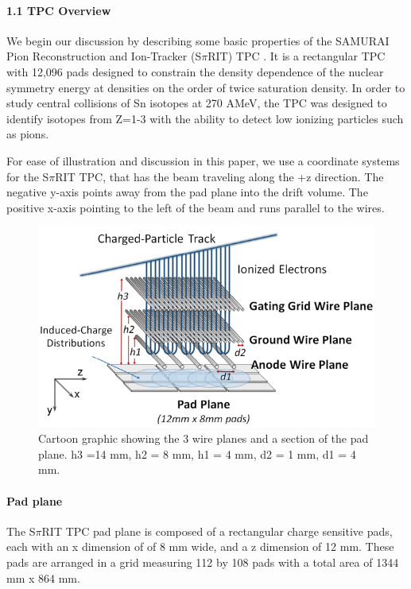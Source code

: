 \documentclass[review]{elsarticle}
\begin{document}
\paragraph{1.1 TPC Overview}
We begin our discussion by describing some basic properties of the SAMURAI Pion Reconstruction and Ion-Tracker (S$\pi$RIT) TPC \citep{shane}. It is a rectangular TPC with 12,096 pads designed to constrain the density dependence of the nuclear symmetry energy at densities on the order of twice saturation density. In order to study central collisions of Sn isotopes at 270 AMeV, the TPC was designed to identify isotopes from Z=1-3 with the ability to detect low ionizing particles such as pions. 

For ease of illustration and discussion in this paper, we use a coordinate systems for the S$\pi$RIT TPC, that has the beam traveling along the +z direction. The negative y-axis points away from the pad plane into the drift volume. The positive x-axis pointing to the left of the beam and runs parallel to the wires. 

\begin{figure}[H]
\includegraphics[width=\linewidth]{padwire}
\caption{Cartoon graphic showing the 3 wire planes and a section of the pad plane. h3 =14 mm, h2 = 8 mm, h1 = 4 mm, d2 = 1 mm, d1 = 4 mm.}
\label{fig:padwire}
\end{figure}

\paragraph{Pad plane} 
The S$\pi$RIT TPC pad plane is composed of a rectangular charge sensitive pads, each with an x dimension of of 8 mm wide, and a z dimension of 12 mm. These pads are arranged in a grid measuring 112 by 108 pads with a total area of 1344 mm x 864 mm.
\end{document}
